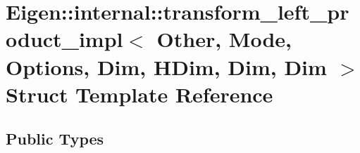 \hypertarget{struct_eigen_1_1internal_1_1transform__left__product__impl_3_01_other_00_01_mode_00_01_options_0b0d1bc6bb0265d07cac191ec3dc368a3}{}\section{Eigen\+:\+:internal\+:\+:transform\+\_\+left\+\_\+product\+\_\+impl$<$ Other, Mode, Options, Dim, H\+Dim, Dim, Dim $>$ Struct Template Reference}
\label{struct_eigen_1_1internal_1_1transform__left__product__impl_3_01_other_00_01_mode_00_01_options_0b0d1bc6bb0265d07cac191ec3dc368a3}
\subsection*{Public Types}
